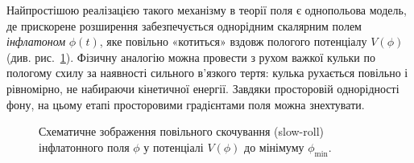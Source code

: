 Найпростішою реалізацією такого механізму в теорії поля є однопольова
модель, де прискорене розширення забезпечується однорідним скалярним
полем \emph{інфлатоном} $\phi(t)$, яке повільно «котиться» вздовж
пологого потенціалу $V(\phi)$ (див. рис.~\ref{fig:slow_roll}). Фізичну аналогію можна провести з
рухом важкої кульки по пологому схилу за наявності сильного
в'язкого тертя: кулька рухається повільно і рівномірно, не
набираючи кінетичної енергії. Завдяки просторовій однорідності
фону, на цьому етапі просторовими градієнтами поля можна знехтувати.

\begin{figure}[h!]
\centering
{}

\caption{Схематичне зображення повільного скочування (slow-roll) інфлатонного поля $\phi$ у потенціалі $V(\phi)$ до мінімуму $\phi_{\min}$.}
\label{fig:slow_roll}
\end{figure}


